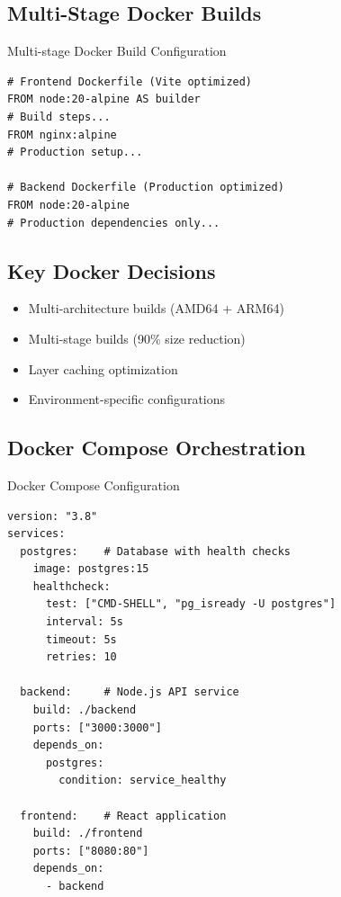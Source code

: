 \documentclass[12pt]{article}
\begin{document}
\subsection{Multi-Stage Docker Builds}

\begin{codebox}{Multi-stage Docker Build Configuration}
\begin{lstlisting}
# Frontend Dockerfile (Vite optimized)
FROM node:20-alpine AS builder
# Build steps...
FROM nginx:alpine
# Production setup...

# Backend Dockerfile (Production optimized)
FROM node:20-alpine
# Production dependencies only...
\end{lstlisting}
\end{codebox}

\subsection{Key Docker Decisions}
\begin{itemize}
\item \textcolor{green}{\faCheckCircle} Multi-architecture builds (AMD64 + ARM64)
\item \textcolor{green}{\faCheckCircle} Multi-stage builds (90\% size reduction)
\item \textcolor{green}{\faCheckCircle} Layer caching optimization
\item \textcolor{green}{\faCheckCircle} Environment-specific configurations
\end{itemize}

\subsection{Docker Compose Orchestration}
\begin{codebox}{Docker Compose Configuration}
\begin{lstlisting}
version: "3.8"
services:
  postgres:    # Database with health checks
    image: postgres:15
    healthcheck:
      test: ["CMD-SHELL", "pg_isready -U postgres"]
      interval: 5s
      timeout: 5s
      retries: 10
  
  backend:     # Node.js API service
    build: ./backend
    ports: ["3000:3000"]
    depends_on:
      postgres:
        condition: service_healthy
  
  frontend:    # React application
    build: ./frontend
    ports: ["8080:80"]
    depends_on:
      - backend
\end{lstlisting}
\end{codebox}
\end{document}
